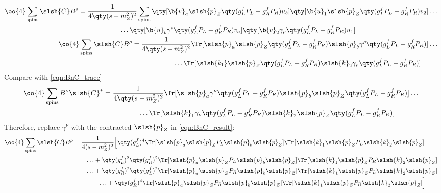 \begin{align}
	\begin{split}
		\oo{4}\sum_\text{spins}\slsh{C}B^\rho&=\frac{1}{4\qty(s-m_Z^2)^2}\sum_\text{spins}
		\qty[\b{v}_a\slsh{p}_Z\qty(g_L^fP_L-g_R^fP_R)u_b]
		\qty[\b{u}_1\slsh{p}_Z\qty(g_L^fP_L-g_R^fP_R)v_2]
		\ldots\\&\qquad\qquad\qquad\ldots
		\qty[\b{u}_b\gamma^\rho\qty(g_L^fP_L-g_R^fP_R)v_a]
		\qty[\b{v}_2\gamma_\rho\qty(g_L^fP_L-g_R^fP_R)u_1]
	\end{split}
	\\
	\label{eqn:CBp_trace}
	\begin{split}
		\oo{4}\sum_\text{spins}\slsh{C}B^\rho
		&=\frac{1}{4\qty(s-m_Z^2)^2}
		\Tr[\slsh{p}_a\slsh{p}_Z\qty(g_L^fP_L-g_R^fP_R)\slsh{p}_b\gamma^\rho\qty(g_L^fP_L-g_R^fP_R)]
		\ldots\\&\qquad\qquad\qquad\ldots
		\Tr[\slsh{k_1}\slsh{p}_Z\qty(g_L^fP_L-g_R^fP_R)\slsh{k}_2\gamma_\rho\qty(g_L^fP_L-g_R^fP_R)]
	\end{split}
\end{align}
Compare with \ref{eqn:BnC_trace}
\begin{align}
	\oo{4}\sum_\text{spins}B^\nu\slsh{C}^*
			&=\frac{1}{4\qty(s-m_Z^2)^2}
			\Tr[\slsh{p}_a\gamma^\nu\qty(g_L^fP_L-g_R^fP_R)\slsh{p}_b\slsh{p}_Z\qty(g_L^fP_L-g_R^fP_R)]
			\ldots\\&\qquad\qquad\quad\ldots
			\Tr[\slsh{k}_1\gamma_\nu\qty(g_L^fP_L-g_R^fP_R)\slsh{k}_2\slsh{p}_Z\qty(g_L^fP_L-g_R^fP_R)]
\end{align}
Therefore, replace $\gamma^\nu$ with the contracted $\slsh{p}_Z$ in \ref{eqn:BnC_result}:
\begin{align}\label{eqn:CBp_result}
	\begin{split}
		\oo{4}\sum_\text{spins}\slsh{C}B^\rho
		&=\frac{1}{4(s-m_Z^2)^2}
		\Big[
		\qty(g_L^f)^4
		\Tr[\slsh{p}_a\slsh{p}_Z P_L\slsh{p}_b\slsh{p}_Z]
		\Tr[\slsh{k}_1\slsh{p}_Z P_L\slsh{k}_2\slsh{p}_Z]
		\\&\qquad\ldots+
		\qty(g_L^f)^2\qty(g_R^f)^2
		\Tr[\slsh{p}_a\slsh{p}_Z P_L\slsh{p}_b\slsh{p}_Z]
		\Tr[\slsh{k}_1\slsh{p}_Z P_R\slsh{k}_2\slsh{p}_Z]
		\\&\qquad\ldots+
		\qty(g_R^f)^2\qty(g_L^f)^2
		\Tr[\slsh{p}_a\slsh{p}_Z P_R\slsh{p}_b\slsh{p}_Z]
		\Tr[\slsh{k}_1\slsh{p}_Z P_L\slsh{k}_2\slsh{p}_Z]
		\\&\qquad\qquad\ldots+
		\qty(g_R^f)^4
		\Tr[\slsh{p}_a\slsh{p}_Z P_R\slsh{p}_b\slsh{p}_Z]
		\Tr[\slsh{k}_1\slsh{p}_Z P_R\slsh{k}_2\slsh{p}_Z]
		\Big]
	\end{split}
\end{align}
